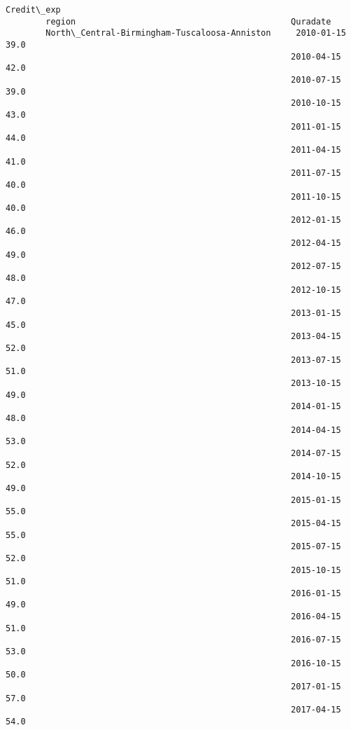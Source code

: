 \documentclass[11pt]{article}
\begin{document}
\begin{Verbatim}[commandchars=\\\{\}]
                                                                     Credit\_exp  
        region                                           Quradate                
        North\_Central-Birmingham-Tuscaloosa-Anniston     2010-01-15        39.0  
                                                         2010-04-15        42.0  
                                                         2010-07-15        39.0  
                                                         2010-10-15        43.0  
                                                         2011-01-15        44.0  
                                                         2011-04-15        41.0  
                                                         2011-07-15        40.0  
                                                         2011-10-15        40.0  
                                                         2012-01-15        46.0  
                                                         2012-04-15        49.0  
                                                         2012-07-15        48.0  
                                                         2012-10-15        47.0  
                                                         2013-01-15        45.0  
                                                         2013-04-15        52.0  
                                                         2013-07-15        51.0  
                                                         2013-10-15        49.0  
                                                         2014-01-15        48.0  
                                                         2014-04-15        53.0  
                                                         2014-07-15        52.0  
                                                         2014-10-15        49.0  
                                                         2015-01-15        55.0  
                                                         2015-04-15        55.0  
                                                         2015-07-15        52.0  
                                                         2015-10-15        51.0  
                                                         2016-01-15        49.0  
                                                         2016-04-15        51.0  
                                                         2016-07-15        53.0  
                                                         2016-10-15        50.0  
                                                         2017-01-15        57.0  
                                                         2017-04-15        54.0  

\end{Verbatim}
\end{document}
